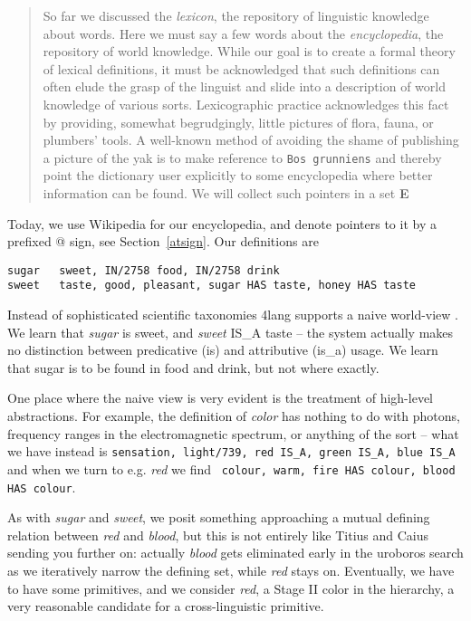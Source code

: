 \documentclass[11pt,bookmarks,bookmarksnumbered,naturalnames,plainpages=false,pdftex,colorlinks=true,urlcolor=blue,bookmarksdepth=subsection,plainpages=false]{paper}
\begin{document}
\begin{quote}
So far we discussed the {\it lexicon}, the repository of linguistic knowledge
about words. Here we must say a few words about the {\it encyclopedia}, the
repository of world knowledge. While our goal is to create a formal theory of
lexical definitions, it must be acknowledged that such definitions can often
elude the grasp of the linguist and slide into a description of world
knowledge of various sorts.  Lexicographic practice acknowledges this fact by
providing, somewhat begrudgingly, little pictures of flora, fauna, or
plumbers' tools. A well-known method of avoiding the shame of publishing a
picture of the yak is to make reference to {\tt Bos grunniens} and thereby
point the dictionary user explicitly to some encyclopedia where better
information can be found. We will collect such pointers in a set {\bf E}
\end{quote}

\noindent
Today, we use Wikipedia for our encyclopedia, and denote pointers to it by a
prefixed @ sign, see Section~\ref{atsign}. Our definitions are 

\begin{verbatim} 
sugar	sweet, IN/2758 food, IN/2758 drink
sweet	taste, good, pleasant, sugar HAS taste, honey HAS taste
\end{verbatim}

\noindent
Instead of sophisticated scientific taxonomies 4lang supports a naive
world-view \citep{Hayes:1979,Gordon:2017}. We learn that {\it sugar} is sweet,
and {\it sweet} IS\_A taste -- the system actually makes no distinction
between predicative (is) and attributive (is\_a) usage. We learn that sugar is
to be found in food and drink, but not where exactly.

One place where the naive view is very evident is the treatment of high-level
abstractions. For example, the definition of {\it color} has nothing to do
with photons, frequency ranges in the electromagnetic spectrum, or anything of
the sort -- what we have instead is {\tt sensation, light/739, red IS\_A,
  green IS\_A, blue IS\_A} and when we turn to e.g. {\it red} we find {\tt
  colour, warm, fire HAS colour, blood HAS colour}. 

As with {\it sugar} and {\it sweet}, we posit something approaching a mutual
defining relation between {\it red} and {\it blood}, but this is not entirely
like Titius and Caius sending you further on: actually {\it blood} gets
eliminated early in the uroboros search as we iteratively narrow the defining
set, while {\it red} stays on. Eventually, we have to have some primitives,
and we consider {\it red}, a Stage II color in the \cite{Berlin:1969}
hierarchy, a very reasonable candidate for a cross-linguistic primitive.
\end{document}
